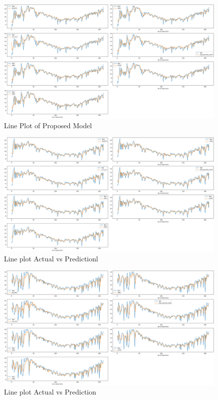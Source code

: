 \documentclass[a4paper,fleqn]{cas-sc}
\begin{document}
\begin{figure}[!ht]
\centering
\includegraphics[width=\textwidth]{Bhuj_act vs pred}
\caption{Line Plot of Proposed Model}
\label{fig:Line plot}
\end{figure}



\begin{figure}[!ht]
\centering
\includegraphics[width=\textwidth]{hyderabad_act vs pred}
\caption{Line plot Actual vs Predictionl}
\label{fig:Line plot}
\end{figure}



\begin{figure}[!ht]
\centering
\includegraphics[width=\textwidth]{Jodhpur (2)_act vs pred}
\caption{Line plot Actual vs Prediction}
\label{fig:Line plot}
\end{figure}
\end{document}
